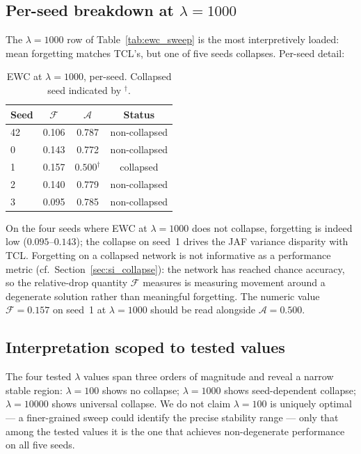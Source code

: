 \subsection{Per-seed breakdown at $\lambda=1000$}

The $\lambda=1000$ row of Table~\ref{tab:ewc_sweep} is the most
interpretively loaded: mean forgetting matches TCL's, but one of
five seeds collapses.
Per-seed detail:

\begin{table}[h]
\centering
\caption{EWC at $\lambda=1000$, per-seed.
Collapsed seed indicated by $^\dagger$.}
\label{tab:ewc_lambda1000}
\begin{tabular}{lccc}
\toprule
Seed & $\mathcal{F}$ & $\mathcal{A}$ & Status \\
\midrule
42  & 0.106 & 0.787 & non-collapsed \\
0   & 0.143 & 0.772 & non-collapsed \\
1   & 0.157 & $0.500^\dagger$ & collapsed \\
2   & 0.140 & 0.779 & non-collapsed \\
3   & 0.095 & 0.785 & non-collapsed \\
\bottomrule
\end{tabular}
\end{table}

On the four seeds where EWC at $\lambda=1000$ does not collapse,
forgetting is indeed low ($0.095$--$0.143$); the collapse on seed~1
drives the JAF variance disparity with TCL.
Forgetting on a collapsed network is not informative as a performance
metric (cf.\ Section~\ref{sec:si_collapse}): the network has reached
chance accuracy, so the relative-drop quantity $\mathcal{F}$ measures
is measuring movement around a degenerate solution rather than
meaningful forgetting.
The numeric value $\mathcal{F} = 0.157$ on seed~1 at $\lambda=1000$
should be read alongside $\mathcal{A} = 0.500$.

\subsection{Interpretation scoped to tested values}

The four tested $\lambda$ values span three orders of magnitude and
reveal a narrow stable region: $\lambda=100$ shows no collapse;
$\lambda=1000$ shows seed-dependent collapse; $\lambda=10000$ shows
universal collapse.
We do not claim $\lambda=100$ is uniquely optimal --- a finer-grained
sweep could identify the precise stability range --- only that among
the tested values it is the one that achieves non-degenerate
performance on all five seeds.

